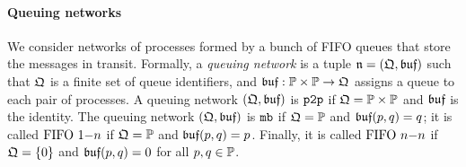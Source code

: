 
\paragraph{\bf Queuing networks}
We consider networks of processes formed by a bunch of FIFO queues that store the messages in transit. 
Formally, a \emph{queuing network} is a tuple $\mathfrak{n}=(\mathfrak{Q},\mathfrak{buf})$ such that 
$\mathfrak{Q}$ is a finite set of queue identifiers, and
$\mathfrak{buf}:\mathbb{P}\times\mathbb{P}\to \mathfrak{Q}$ assigns a queue to each 
pair of processes. 
A queuing network $(\mathfrak{Q},\mathfrak{buf})$ is $\mathtt{p2p}$ if 
$\mathfrak{Q}=\mathbb{P}\times\mathbb{P}$ and $\mathfrak{buf}$ is the identity.
The queuing network $(\mathfrak{Q},\mathfrak{buf})$ is $\mathtt{mb}$ if 
$\mathfrak{Q}=\mathbb{P}$ and $\mathfrak{buf}(p,q)=q$; it is called $\text{FIFO } 1\mathsf{-}n$ if
$\mathfrak{Q}=\mathbb{P}$ and $\mathfrak{buf}(p,q)=p$. Finally, it is called
$\text{FIFO } n\mathsf{-}n$ if $\mathfrak{Q}=\{0\}$ and $\mathfrak{buf}(p,q)=0$ for all $p,q\in\mathbb{P}$.

